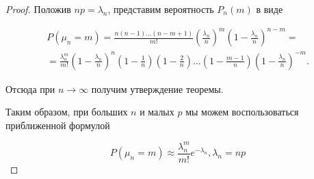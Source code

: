 \begin{proof}
Положив $np = \lambda_n$, представим вероятность $P_n(m)$ в виде

\begin{multline*}
P(\mu_n = m) = \frac{n(n - 1)\ldots(n - m + 1)}{m!} \left( \frac{\lambda_n}{n}\right)^m\left( 1 - \frac{\lambda_n}{n}\right)^{n - m} = \\
= \frac{\lambda_n^m}{m!} \left( 1 - \frac{\lambda_n}{n}\right)^n \left( 1 - \frac{1}{n}\right)\left(1 - \frac{2}{n} \right) \ldots \left( 1 - \frac{m - 1}{n}\right)\left(1 - \frac{\lambda_n}{n} \right)^{-m}.
\end{multline*}

Отсюда при $n \to \infty$ получим утверждение теоремы.

Таким образом, при больших $n$ и малых $p$ мы можем воспользоваться приближенной формулой

$$
P(\mu_n = m) \approx \frac{\lambda_n^m}{m!} e^{-\lambda_n},	\lambda_n = np
$$
\end{proof}